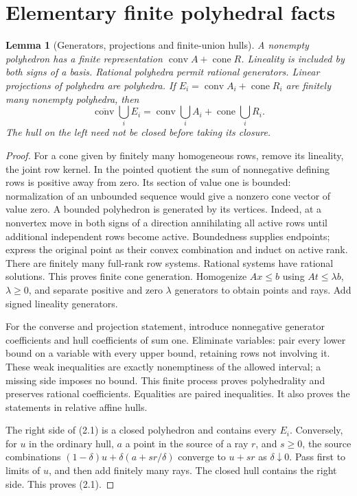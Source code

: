 \documentclass[11pt]{article}
\newtheorem{lemma}[theorem]{Lemma}
\newcommand{\conv}{\operatorname{conv}}
\newcommand{\cone}{\operatorname{cone}}
\newcommand{\clconv}{\overline{\operatorname{conv}}}
\begin{document}
\section{Elementary finite polyhedral facts}
\begin{lemma}[Generators, projections and finite-union hulls]\label{lem:hull}
A nonempty polyhedron has a finite representation $\conv A+\cone R$. Lineality is included by both signs of a basis. Rational polyhedra permit rational generators. Linear projections of polyhedra are polyhedra. If $E_i=\conv A_i+\cone R_i$ are finitely many nonempty polyhedra, then
\[
 \clconv\bigcup_i E_i=\conv\bigcup_i A_i+\cone\bigcup_i R_i.                 \tag{2.1}
\]
The hull on the left need not be closed before taking its closure.
\end{lemma}
\begin{proof}
For a cone given by finitely many homogeneous rows, remove its lineality, the joint row kernel. In the pointed quotient the sum of nonnegative defining rows is positive away from zero. Its section of value one is bounded: normalization of an unbounded sequence would give a nonzero cone vector of value zero. A bounded polyhedron is generated by its vertices. Indeed, at a nonvertex move in both signs of a direction annihilating all active rows until additional independent rows become active. Boundedness supplies endpoints; express the original point as their convex combination and induct on active rank. There are finitely many full-rank row systems. Rational systems have rational solutions. This proves finite cone generation. Homogenize $Ax\leq b$ using $At\leq \lambda b$, $\lambda\geq0$, and separate positive and zero $\lambda$ generators to obtain points and rays. Add signed lineality generators.

For the converse and projection statement, introduce nonnegative generator coefficients and hull coefficients of sum one. Eliminate variables: pair every lower bound on a variable with every upper bound, retaining rows not involving it. These weak inequalities are exactly nonemptiness of the allowed interval; a missing side imposes no bound. This finite process proves polyhedrality and preserves rational coefficients. Equalities are paired inequalities. It also proves the statements in relative affine hulls.

The right side of (2.1) is a closed polyhedron and contains every $E_i$. Conversely, for $u$ in the ordinary hull, $a$ a point in the source of a ray $r$, and $s\geq0$, the source combinations
$(1-\delta)u+\delta(a+sr/\delta)$ converge to $u+sr$ as $\delta\downarrow0$. Pass first to limits of $u$, and then add finitely many rays. The closed hull contains the right side. This proves (2.1).
\end{proof}
\end{document}
